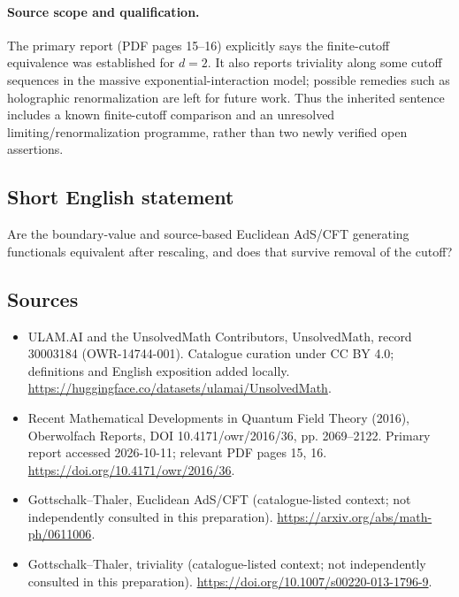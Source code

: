 \documentclass[11pt]{article}
\begin{document}
\paragraph{Source scope and qualification.}
The primary report (PDF pages 15--16) explicitly says the finite-cutoff equivalence was established for $d=2$. It also reports triviality along some cutoff sequences in the massive exponential-interaction model; possible remedies such as holographic renormalization are left for future work. Thus the inherited sentence includes a known finite-cutoff comparison and an unresolved limiting/renormalization programme, rather than two newly verified open assertions.
\subsection{Short English statement}
Are the boundary-value and source-based Euclidean AdS/CFT generating functionals equivalent after rescaling, and does that survive removal of the cutoff?
\subsection{Sources}
\begin{itemize}
\item[\hypertarget{source:30003184:1}{S1}] ULAM.AI and the UnsolvedMath Contributors, UnsolvedMath, record 30003184 (OWR-14744-001). Catalogue curation under CC BY 4.0; definitions and English exposition added locally.
\url{https://huggingface.co/datasets/ulamai/UnsolvedMath}.
\item[\hypertarget{source:30003184:2}{S2}] Recent Mathematical Developments in Quantum Field Theory (2016), Oberwolfach Reports, DOI 10.4171/owr/2016/36, pp. 2069--2122. Primary report accessed 2026-10-11; relevant PDF pages 15, 16.
\url{https://doi.org/10.4171/owr/2016/36}.
\item[\hypertarget{source:30003184:3}{S3}] Gottschalk--Thaler, Euclidean AdS/CFT (catalogue-listed context; not independently consulted in this preparation).
\url{https://arxiv.org/abs/math-ph/0611006}.
\item[\hypertarget{source:30003184:4}{S4}] Gottschalk--Thaler, triviality (catalogue-listed context; not independently consulted in this preparation).
\url{https://doi.org/10.1007/s00220-013-1796-9}.
\end{itemize}
\label{end:30003184}
\end{document}
